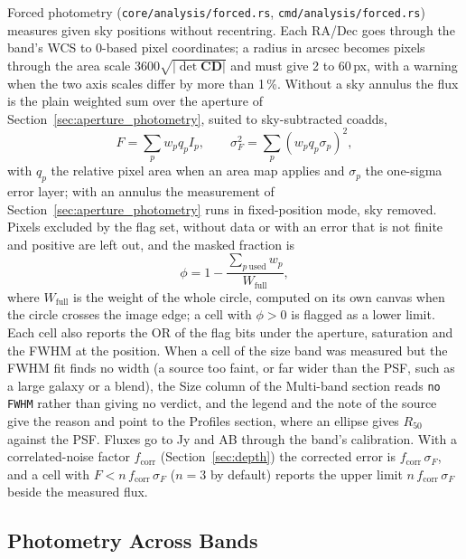 \documentclass[11pt,a4paper]{article}
\newcommand{\code}[1]{\texttt{\small #1}}
\newcommand{\mat}[1]{\mathbf{#1}}
\begin{document}
    Forced photometry (\code{core/analysis/forced.rs}, \code{cmd/analysis/forced.rs}) measures given sky positions without recentring. Each RA/Dec goes through the band's WCS to 0-based pixel coordinates; a radius in arcsec becomes pixels through the area scale $3600\sqrt{|\det \mat{CD}|}$ and must give 2 to 60\,px, with a warning when the two axis scales differ by more than 1\,\%. Without a sky annulus the flux is the plain weighted sum over the aperture of Section~\ref{sec:aperture_photometry}, suited to sky-subtracted coadds,
    \begin{equation}
        F = \sum_p w_p q_p I_p, \qquad \sigma_F^2 = \sum_p (w_p q_p \sigma_p)^2,
    \end{equation}
    with $q_p$ the relative pixel area when an area map applies and $\sigma_p$ the one-sigma error layer; with an annulus the measurement of Section~\ref{sec:aperture_photometry} runs in fixed-position mode, sky removed. Pixels excluded by the flag set, without data or with an error that is not finite and positive are left out, and the masked fraction is
    \begin{equation}
        \phi = 1 - \frac{\sum_{p\ \text{used}} w_p}{W_{\text{full}}},
    \end{equation}
    where $W_{\text{full}}$ is the weight of the whole circle, computed on its own canvas when the circle crosses the image edge; a cell with $\phi > 0$ is flagged as a lower limit. Each cell also reports the OR of the flag bits under the aperture, saturation and the FWHM at the position. When a cell of the size band was measured but the FWHM fit finds no width (a source too faint, or far wider than the PSF, such as a large galaxy or a blend), the Size column of the Multi-band section reads \code{no FWHM} rather than giving no verdict, and the legend and the note of the source give the reason and point to the Profiles section, where an ellipse gives $R_{50}$ against the PSF. Fluxes go to Jy and AB through the band's calibration. With a correlated-noise factor $f_{\text{corr}}$ (Section~\ref{sec:depth}) the corrected error is $f_{\text{corr}}\,\sigma_F$, and a cell with $F < n\,f_{\text{corr}}\,\sigma_F$ ($n = 3$ by default) reports the upper limit $n\,f_{\text{corr}}\,\sigma_F$ beside the measured flux.

    \subsection{Photometry Across Bands}
    \label{sec:forced_bands}
\end{document}
